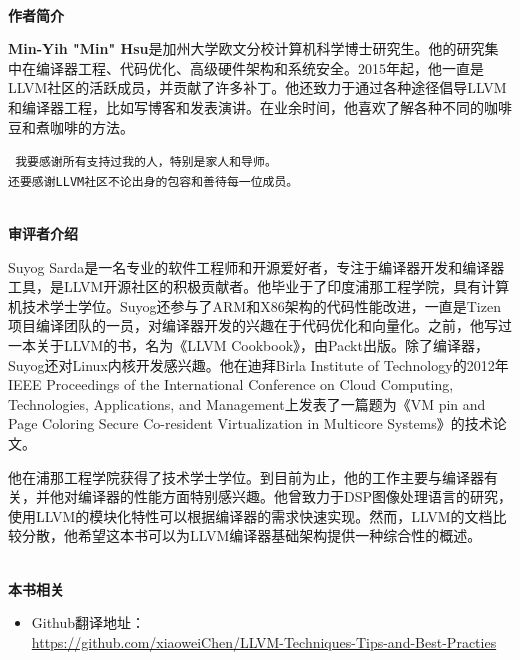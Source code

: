 \documentclass[11pt,a4paper,UTF8]{book}
\begin{document}
	\hspace*{\fill} \\ %
	\noindent\textbf{作者简介}
	
	\textbf{Min-Yih "Min" Hsu}是加州大学欧文分校计算机科学博士研究生。他的研究集中在编译器工程、代码优化、高级硬件架构和系统安全。2015年起，他一直是LLVM社区的活跃成员，并贡献了许多补丁。他还致力于通过各种途径倡导LLVM和编译器工程，比如写博客和发表演讲。在业余时间，他喜欢了解各种不同的咖啡豆和煮咖啡的方法。
	\begin{center}
		\tt
		我要感谢所有支持过我的人，特别是家人和导师。\\还要感谢LLVM社区不论出身的包容和善待每一位成员。
	\end{center}

	\thispagestyle{empty}
	\hspace*{\fill} \\ %
	\noindent\textbf{审评者介绍}
	
	Suyog Sarda是一名专业的软件工程师和开源爱好者，专注于编译器开发和编译器工具，是LLVM开源社区的积极贡献者。他毕业于了印度浦那工程学院，具有计算机技术学士学位。Suyog还参与了ARM和X86架构的代码性能改进，一直是Tizen项目编译团队的一员，对编译器开发的兴趣在于代码优化和向量化。之前，他写过一本关于LLVM的书，名为《LLVM Cookbook》，由Packt出版。除了编译器，Suyog还对Linux内核开发感兴趣。他在迪拜Birla Institute of Technology的2012年IEEE Proceedings of the International Conference on Cloud Computing, Technologies, Applications, and Management上发表了一篇题为《VM pin and Page Coloring Secure Co-resident Virtualization in Multicore Systems》的技术论文。
	
	他在浦那工程学院获得了技术学士学位。到目前为止，他的工作主要与编译器有关，并他对编译器的性能方面特别感兴趣。他曾致力于DSP图像处理语言的研究，使用LLVM的模块化特性可以根据编译器的需求快速实现。然而，LLVM的文档比较分散，他希望这本书可以为LLVM编译器基础架构提供一种综合性的概述。
	
	
	\hspace*{\fill} \\ %
	\noindent\textbf{本书相关}
	\begin{itemize}
		\item Github翻译地址：\\\url{https://github.com/xiaoweiChen/LLVM-Techniques-Tips-and-Best-Practies}
	\end{itemize}
	\newpage
	
	\pagestyle{empty}
	
	\newpage
	
	\tableofcontents
	\newpage
	
\end{document}
